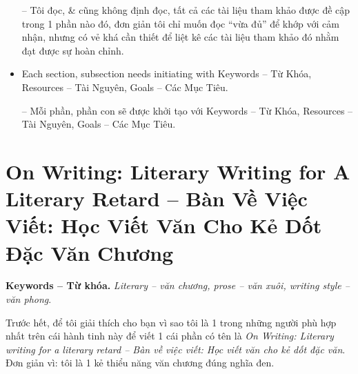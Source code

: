 \documentclass[12pt,twoside]{book}
\begin{document}
\begin{itemize}
	-- Tôi đọc, \& cũng không định đọc, tất cả các tài liệu tham khảo được đề cập trong 1 phần nào đó, đơn giản tôi chỉ muốn đọc ``vừa đủ'' để khớp với cảm nhận, nhưng có vẻ khá cần thiết để liệt kê các tài liệu tham khảo đó nhằm đạt được sự hoàn chỉnh.
	\item Each section, subsection needs initiating with {\sf Keywords -- Từ Khóa, Resources -- Tài Nguyên, Goals -- Các Mục Tiêu}.
	
	-- Mỗi phần, phần con sẽ được khởi tạo với {\sf Keywords -- Từ Khóa, Resources -- Tài Nguyên, Goals -- Các Mục Tiêu}.
\end{itemize}

\chapter{On Writing: Literary Writing for A Literary Retard -- Bàn Về Việc Viết: Học Viết Văn Cho Kẻ Dốt Đặc Văn Chương}
\minitoc
{\bf \textsf{Keywords -- Từ khóa.}} {\it Literary -- văn chương, prose -- văn xuôi, writing style -- văn phong}.

Trước hết, để tôi giải thích cho bạn vì sao tôi là 1 trong những người phù hợp nhất trên cái hành tinh này để viết 1 cái phần có tên là {\it On Writing: Literary writing for a literary retard -- Bàn về việc viết: Học viết văn cho kẻ dốt đặc văn}. Đơn giản vì: tôi là 1 kẻ thiểu năng văn chương đúng nghĩa đen.
\end{document}
